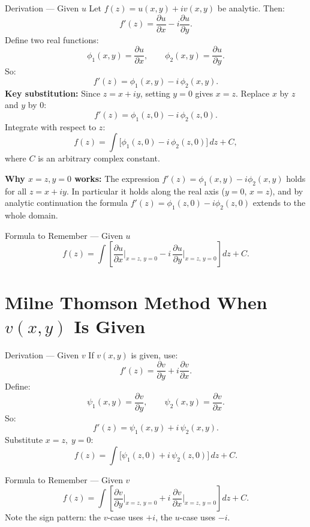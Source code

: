 \documentclass[12pt,a4paper]{article}
\begin{document}
\begin{infobox}{Derivation --- Given \( u \)}
Let \( f(z) = u(x,y) + iv(x,y) \) be analytic. Then:
\[
f'(z) = \frac{\partial u}{\partial x} - i\frac{\partial u}{\partial y}.
\]
Define two real functions:
\[
\phi_1(x,y) = \frac{\partial u}{\partial x}, \qquad \phi_2(x,y) = \frac{\partial u}{\partial y}.
\]
So:
\[
f'(z) = \phi_1(x,y) - i\,\phi_2(x,y).
\]
\textbf{Key substitution:} Since \( z = x + iy \), setting \( y = 0 \) gives \( x = z \). Replace \( x \) by \( z \) and \( y \) by \( 0 \):
\[
f'(z) = \phi_1(z,0) - i\,\phi_2(z,0).
\]
Integrate with respect to \( z \):
\[
\boxed{f(z) = \int \bigl[\phi_1(z,0) - i\,\phi_2(z,0)\bigr]\,dz + C,}
\]
where \( C \) is an arbitrary complex constant.

\textbf{Why \( x = z, y = 0 \) works:}
The expression \( f'(z) = \phi_1(x,y) - i\phi_2(x,y) \) holds for all \( z = x+iy \). In particular it holds along the real axis (\( y=0 \), \( x = z \)), and by analytic continuation the formula \( f'(z) = \phi_1(z,0) - i\phi_2(z,0) \) extends to the whole domain.
\end{infobox}

\begin{learnbox}{Formula to Remember --- Given \( u \)}
\[
f(z) = \int \left[\frac{\partial u}{\partial x}\bigg|_{x=z,\,y=0} - i\,\frac{\partial u}{\partial y}\bigg|_{x=z,\,y=0}\right]dz + C.
\]
\end{learnbox}

\section{Milne Thomson Method When \texorpdfstring{\( v(x,y) \)}{v(x,y)} Is Given}

\begin{infobox}{Derivation --- Given \( v \)}
If \( v(x,y) \) is given, use:
\[
f'(z) = \frac{\partial v}{\partial y} + i\frac{\partial v}{\partial x}.
\]
Define:
\[
\psi_1(x,y) = \frac{\partial v}{\partial y}, \qquad \psi_2(x,y) = \frac{\partial v}{\partial x}.
\]
So:
\[
f'(z) = \psi_1(x,y) + i\,\psi_2(x,y).
\]
Substitute \( x = z,\; y = 0 \):
\[
\boxed{f(z) = \int \bigl[\psi_1(z,0) + i\,\psi_2(z,0)\bigr]\,dz + C.}
\]
\end{infobox}

\begin{learnbox}{Formula to Remember --- Given \( v \)}
\[
f(z) = \int \left[\frac{\partial v}{\partial y}\bigg|_{x=z,\,y=0} + i\,\frac{\partial v}{\partial x}\bigg|_{x=z,\,y=0}\right]dz + C.
\]
Note the sign pattern: the \( v \)-case uses \( +i \), the \( u \)-case uses \( -i \).
\end{learnbox}
\end{document}
